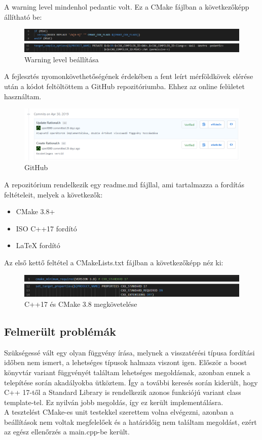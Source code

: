 \documentclass[a4paper, 12pt]{article}
\begin{document}
A warning level mindenhol pedantic volt. Ez a CMake fájlban a következőképp állítható be:
\\
\begin{figure}[!h]
\includegraphics[width=1\textwidth]{cmake3.png}
\caption{Warning level beállítása}
\end{figure}


A fejlesztés nyomonkövethetőségének érdekében a fent leírt mérföldkövek elérése után a kódot feltöltöttem a GitHub repozitóriumba. Ehhez az online felületet használtam.

\begin{figure}[!h]
\centering
\includegraphics[width=1\textwidth]{github.png}
\caption{GitHub}
\end{figure}

A repozitórium rendelkezik egy readme.md fájllal, ami tartalmazza a fordítás feltételeit, melyek a következők:
\begin{itemize}
    \item CMake 3.8+
    \item ISO C++17 fordító
    \item LaTeX fordító
\end{itemize}

Az első kettő feltétel a CMakeLists.txt fájlban a következőképp néz ki:
\begin{figure}[h!]
\includegraphics[width=1\textwidth]{cmake2.png}
\caption{C++17 és CMake 3.8 megkövetelése}
\end{figure}

\subsection*{Felmerült problémák}
\indent
Szükségessé vált egy olyan függvény írása, melynek a visszatérési típusa fordítási időben nem ismert, a  lehetséges típusok halmaza viszont igen. Először a boost könyvtár variant függvényét találtam lehetséges megoldásnak, azonban ennek a telepítése során akadályokba ütköztem. Így a további keresés során kiderült, hogy C++ 17-től a Standard Library is rendelkezik azonos funkciójú variant class template-tel. Ez nyilván jobb megoldás, így ez került implementálásra.
\\
\indent
A tesztelést CMake-es unit testekkel szerettem volna elvégezni, azonban a beállítások nem voltak megfelelőek és a határidőig nem találtam megoldást, ezért az egész ellenőrzés a main.cpp-be került.
\end{document}
